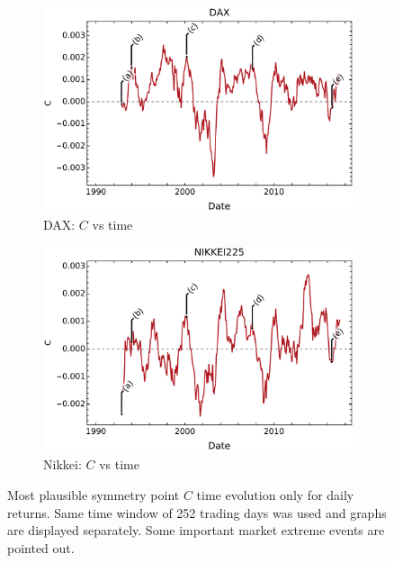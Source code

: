 \documentclass{elsarticle}
\begin{document}
\begin{figure}[h!tb]
\begin{subfigure}[b]{0.45\textwidth}
            \centering 
            \includegraphics[width=\textwidth]{figures/timesymmetry/Returns/Simetria_DAX_CL005.pdf}
            \caption[]%
            {{\small DAX: $C$ vs time}}
            \label{fig:TVRetsTimeFigsDAX}
        \end{subfigure}
        \quad
        \begin{subfigure}[b]{0.45\textwidth}
            \centering 
            \includegraphics[width=\textwidth]{figures/timesymmetry/Returns/Simetria_NIKKEI_CL005.pdf}
            \caption[]%
            {{\small Nikkei: $C$ vs time}}
            \label{fig:TVRetsTimeFigsNikkei}
        \end{subfigure}
        \caption[Plots of most plausible symmetry point $C$ time evolution for simple returns..]
        {\small Most plausible symmetry point $C$ time evolution only for daily returns. Same time window of 252 trading days was used and graphs are displayed separately. Some important market extreme events are pointed out.} 
        \label{fig:CvsTRets}
\end{figure}
\end{document}
